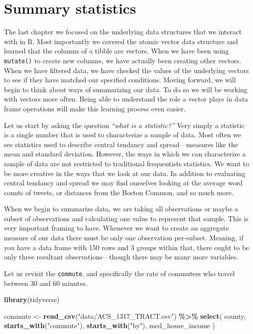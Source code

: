 \documentclass[
]{book}
\newenvironment{Shaded}{\begin{snugshade}}{\end{snugshade}}
\newcommand{\KeywordTok}[1]{\textcolor[rgb]{0.13,0.29,0.53}{\textbf{#1}}}
\newcommand{\NormalTok}[1]{#1}
\newcommand{\OperatorTok}[1]{\textcolor[rgb]{0.81,0.36,0.00}{\textbf{#1}}}
\newcommand{\StringTok}[1]{\textcolor[rgb]{0.31,0.60,0.02}{#1}}
\begin{document}
\hypertarget{summary-statistics}{%
\chapter{Summary statistics}\label{summary-statistics}}

The last chapter we focused on the underlying data structures that we interact with in R. Most importantly we covered the atomic vector data structure and learned that the columns of a tibble are vectors. When we have been using \texttt{mutate()} to create new columns, we have actually been creating other vectors. When we have filtered data, we have checked the values of the underlying vectors to see if they have matched our specified conditions. Moving forward, we will begin to think about ways of summarizing our data. To do so we will be working with vectors more often. Being able to understand the role a vector plays in data frame operations will make this learning process even easier.

Let us start by asking the question \emph{``what is a statistic?''} Very simply a statistic is a single number that is used to characterize a sample of data. Most often we see statistics used to describe central tendancy and spread---measures like the mean and standard deviation. However, the ways in which we can characterize a sample of data are not restricted to traditional frequentists statistics. We want to be more creative in the ways that we look at our data. In addition to evaluating central tendancy and spread we may find ourselves looking at the average word counts of tweets, or distances from the Boston Common, and so much more.

When we begin to summarize data, we are taking all observations or maybe a subset of observations and calculating one value to represent that sample. This is very important framing to have. Whenever we want to create an aggregate measure of our data there must be only one observation per-subset. Meaning, if you have a data frame with 150 rows and 3 groups within that, there ought to be only three resultant observations---though there may be many more variables.

Let us revisit the \texttt{commute}, and specifically the rate of commuters who travel between 30 and 60 minutes.

\begin{Shaded}
\begin{Highlighting}[]
\KeywordTok{library}\NormalTok{(tidyverse)}

\NormalTok{commute \textless{}{-}}\StringTok{ }\KeywordTok{read\_csv}\NormalTok{(}\StringTok{"data/ACS\_1317\_TRACT.csv"}\NormalTok{) }\OperatorTok{\%\textgreater{}\%}\StringTok{ }
\StringTok{  }\KeywordTok{select}\NormalTok{(}
\NormalTok{    county,}
    \KeywordTok{starts\_with}\NormalTok{(}\StringTok{"commute"}\NormalTok{),}
    \KeywordTok{starts\_with}\NormalTok{(}\StringTok{"by"}\NormalTok{),}
\NormalTok{    med\_house\_income}
\NormalTok{  ) }
\end{Highlighting}
\end{Shaded}
\end{document}
